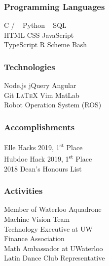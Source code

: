 \documentclass{mxresume}
\begin{document}
\begin{resumeheading}
\headingPad
\end{resumeheading}
%
\begin{minipage}[t]{0.26\textwidth}
\begin{sidebar}
\\[1mm]
 \\[1mm]
 \\[1mm]
\subsubsection*{Programming Languages}
C / \Cpp\ \Bullet 
Python \Bullet 
\Csharp\ \Bullet 
SQL \\[1mm]
HTML \Bullet 
CSS \Bullet 
JavaScript \\[1mm]
TypeScript \Bullet 
R \Bullet 
Scheme \Bullet 
Bash
%
\subsubsection*{Technologies}
Node.js \Bullet 
jQuery \Bullet 
Angular\\[1mm]
Git \Bullet 
\textsc{\LaTeX} \Bullet 
Vim \Bullet 
MatLab \\[1mm]
Robot Operation System (ROS) 
\subsubsection*{Accomplishments}
Elle Hacks 2019, 1\textsuperscript{st} Place \\[1mm]
Hubdoc Hack 2019, 1\textsuperscript{st} Place \\[1mm]
2018 Dean's Honours List
\subsubsection*{Activities}
Member of Waterloo Aquadrone \\
Machine Vision Team\\[1mm]
Technology Executive at UW \\
Finance Association \\[1mm]
Math Ambassador at UWaterloo \\[1mm]
Latin Dance Club Representative

\end{sidebar}
\end{minipage}
\end{document}
